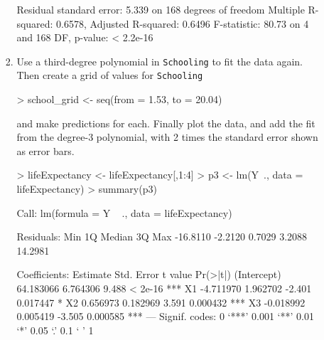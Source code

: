 \documentclass[12pt,a4paper]{paper}
\begin{document}
\begin{enumerate}
\begin{enumerate}
\begin{enumerate}
\begin{Schunk}
\begin{Soutput}
Residual standard error: 5.339 on 168 degrees of freedom
Multiple R-squared:  0.6578,	Adjusted R-squared:  0.6496 
F-statistic: 80.73 on 4 and 168 DF,  p-value: < 2.2e-16
\end{Soutput}
\end{Schunk}
\item Use a third-degree polynomial in \texttt{Schooling} to fit the data again. Then create a grid of values for \texttt{Schooling}
\begin{Schunk}
\begin{Sinput}
> school_grid <- seq(from = 1.53, to = 20.04)
\end{Sinput}
\end{Schunk}
and make predictions for each. Finally plot the data, and add the fit from the degree-3 polynomial, with 2 times the standard error shown as error bars.
\begin{Schunk}
\begin{Sinput}
> lifeExpectancy <- lifeExpectancy[,1:4]
> p3 <- lm(Y~., data = lifeExpectancy)
> summary(p3)
\end{Sinput}
\begin{Soutput}
Call:
lm(formula = Y ~ ., data = lifeExpectancy)

Residuals:
     Min       1Q   Median       3Q      Max 
-16.8110  -2.2120   0.7029   3.2088  14.2981 

Coefficients:
             Estimate Std. Error t value Pr(>|t|)    
(Intercept) 64.183066   6.764306   9.488  < 2e-16 ***
X1          -4.711970   1.962702  -2.401 0.017447 *  
X2           0.656973   0.182969   3.591 0.000432 ***
X3          -0.018992   0.005419  -3.505 0.000585 ***
---
Signif. codes:  0 ‘***’ 0.001 ‘**’ 0.01 ‘*’ 0.05 ‘.’ 0.1 ‘ ’ 1


\end{Soutput}
\end{Schunk}
\end{enumerate}
\end{enumerate}
\end{enumerate}
\end{document}
